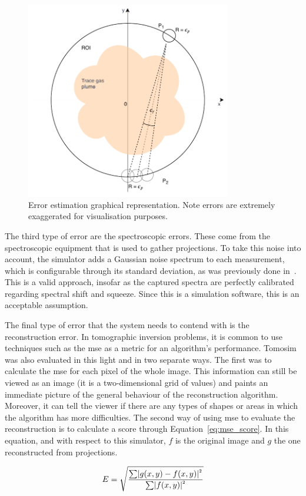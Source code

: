 \begin{figure}[htpb]
    \centering
    \includegraphics[width=0.8\textwidth]{img/pdf/error_estimation_2.pdf}
    \caption{Error estimation graphical representation. Note errors are
    extremely exaggerated for visualisation purposes.}
    \label{fig:geometric_error_calculation}
\end{figure}

The third type of error are the spectroscopic errors. These come from
the spectroscopic equipment that is used to gather projections. To take
this noise into account, the simulator adds a Gaussian noise spectrum to
each measurement, which is configurable through its standard deviation,
as was previously done in~\cite{Stutz1996}. This is a valid approach,
insofar as the captured spectra are perfectly calibrated regarding
spectral shift and squeeze. Since this is a simulation software, this is
an acceptable assumption.

The final type of error that the system needs to contend with is the
reconstruction error. In tomographic inversion problems, it is common to
use techniques such as the \gls{mse} as a metric for an algorithm's
performance. Tomosim was also evaluated in this light and in two
separate ways. The first was to calculate the \gls{mse} for each pixel of the
whole image. This information can still be viewed as an image (it is a
two-dimensional grid of values) and paints an immediate picture of the
general behaviour of the reconstruction algorithm. Moreover, it can tell
the viewer if there are any types of shapes or areas in which the
algorithm has more difficulties. The second way of using \gls{mse} to
evaluate the reconstruction is to calculate a score through
Equation~\ref{eq:mse_score}. In this equation, and with respect to this
simulator, $f$ is the original image and $g$ the one reconstructed from
projections.

\begin{equation}
    \centering
    \label{eq:mse_score}
    E = \sqrt{\frac{\sum\lvert g(x,y) - f(x,y)
    \lvert^{^{2}}}{\sum\lvert f(x,y) \lvert ^{^{2}}}}
\end{equation}


